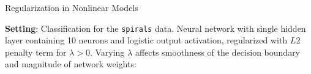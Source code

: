 \begin{frame}{Regularization in Nonlinear Models}

\small
\textbf{Setting}: Classification for the \texttt{spirals} data.
Neural network with single hidden layer containing 10 neurons and logistic
output activation, regularized with $L2$ penalty term for $\lambda > 0$.
Varying $\lambda$ affects smoothness of the decision boundary and magnitude of
network weights:

\vfill


\end{frame}
